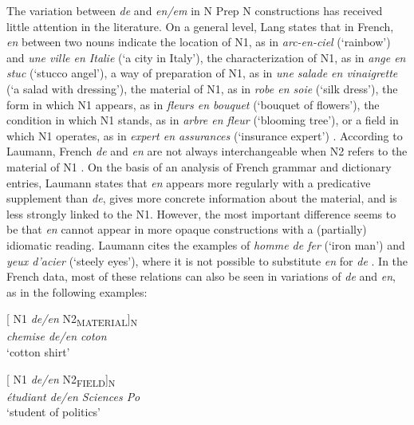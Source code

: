 \documentclass[output=paper]{langsci/langscibook}
\begin{document}
The variation between \textit{de} and \textit{en/em} in N Prep N constructions has received little attention in the literature. On a general level, Lang states that in French, \textit{en} between two nouns indicate the location of N1, as in \textit{arc-en-ciel} (`rainbow') and \textit{une ville en Italie} (`a city in Italy'), the characterization of N1, as in \textit{ange en stuc} (`stucco angel'), a way of preparation of N1, as in \textit{une salade en vinaigrette} (`a salad with dressing'), the material of N1, as in \textit{robe en soie} (`silk dress'), the form in which N1 appears, as in \textit{fleurs en bouquet} (`bouquet of flowers'), the condition in which N1 stands, as in \textit{arbre en fleur} (`blooming tree'), or a field in which N1 operates, as in \textit{expert en assurances} (`insurance expert') \citep[411]{Lang:1991}. According to Laumann, French\textit{ de} and \textit{en} are not always interchangeable when N2 refers to the material of N1 \citep[55]{Laumann:1998}. On the basis of an analysis of French grammar and dictionary entries, Laumann states that \textit{en} appears more regularly with a predicative supplement than \textit{de}, gives more concrete information about the material, and is less strongly linked to the N1. However, the most important difference seems to be that \textit{en} cannot appear in more opaque constructions with a (partially) idiomatic reading. Laumann cites the examples of \textit{homme de fer} (`iron man') and \textit{yeux d’acier} (`steely eyes'), where it is not possible to substitute \textit{en} for \textit{de} \citep[55]{Laumann:1998}. In the French data, most of these relations can also be seen in variations of \textit{de} and \textit{en}, as in the following examples:

\begin{exe}\ex\begin{minipage}[t]{0.4\textwidth}    %
[ N1 \textit{de/en} N2\textsubscript{MATERIAL}]\textsubscript{N}\\
\textit{chemise de/en coton}\\
`cotton shirt'
\end{minipage}\hfill            %
\begin{minipage}[t]{0.45\textwidth}
[ N1 \textit{de/en} N2\textsubscript{FIELD}]\textsubscript{N}\\
\textit{étudiant de/en Sciences Po}\\
`student of politics'
\end{minipage}
\end{exe}
\end{document}
